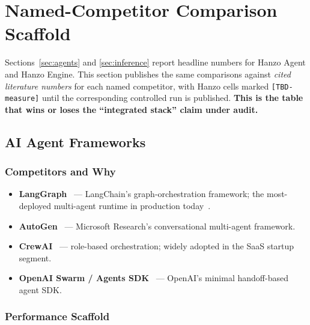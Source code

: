 \onecolumn
\section{Named-Competitor Comparison Scaffold}
\label{sec:hanzo-named-comp}

Sections~\ref{sec:agents} and \ref{sec:inference} report headline numbers
for Hanzo Agent and Hanzo Engine. This section publishes the same
comparisons against \emph{cited literature numbers} for each named
competitor, with Hanzo cells marked \texttt{[TBD-measure]} until the
corresponding controlled run is published. \textbf{This is the table
that wins or loses the ``integrated stack'' claim under audit.}

\subsection{AI Agent Frameworks}

\subsubsection*{Competitors and Why}

\begin{itemize}
  \item \textbf{LangGraph}~\cite{langgraphgithub} --- LangChain's
        graph-orchestration framework; the most-deployed multi-agent
        runtime in production today~\cite{pecollective2026agentframeworks}.
  \item \textbf{AutoGen}~\cite{autogengithub} --- Microsoft Research's
        conversational multi-agent framework.
  \item \textbf{CrewAI}~\cite{crewaigithub} --- role-based orchestration;
        widely adopted in the SaaS startup segment.
  \item \textbf{OpenAI Swarm / Agents SDK}~\cite{openaiagentssdk} ---
        OpenAI's minimal handoff-based agent SDK.
\end{itemize}

\subsubsection*{Performance Scaffold}

